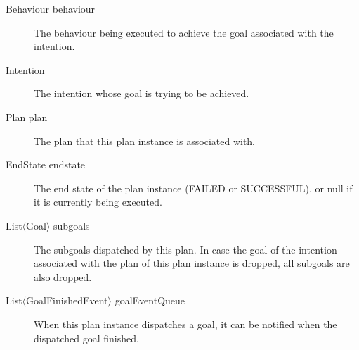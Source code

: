 \documentclass{article}
\begin{document}
\begin{description}
	\item[Behaviour behaviour] The behaviour being executed to achieve the goal associated with the intention.
	\item[Intention] The intention whose goal is trying to be achieved.
	\item[Plan plan] The plan that this plan instance is associated with.
	\item[EndState endstate] The end state of the plan instance (FAILED or SUCCESSFUL), or null if it is currently being executed.
	\item[List$\langle$Goal$\rangle$ subgoals] The subgoals dispatched by this plan. In case the goal of the intention associated with the plan of this plan instance is dropped, all subgoals are also dropped.
	\item[List$\langle$GoalFinishedEvent$\rangle$ goalEventQueue] When this plan instance dispatches a goal, it can be notified when the dispatched goal finished.
\end{description}



\end{document}
